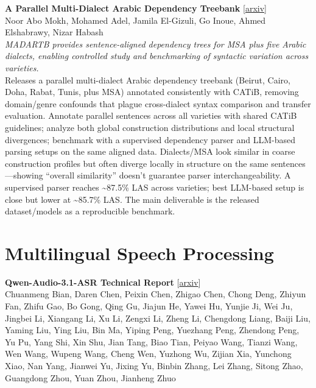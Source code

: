 \documentclass[12pt,letterpaper]{article}
\begin{document}
\medskip

{\small\textbf{A Parallel Multi-Dialect Arabic Dependency Treebank}} {\scriptsize[\href{https://arxiv.org/abs/2610.28823}{arxiv}]}\\
{\scriptsize Noor Abo Mokh, Mohamed Adel, Jamila El-Gizuli, Go Inoue, Ahmed Elshabrawy, Nizar Habash}\\

{\small\textit{MADARTB provides sentence-aligned dependency trees for MSA plus five Arabic dialects, enabling controlled study and benchmarking of syntactic variation across varieties.}}\\[1pt]
{\footnotesize Releases a parallel multi-dialect Arabic dependency treebank (Beirut, Cairo, Doha, Rabat, Tunis, plus MSA) annotated consistently with CATiB, removing domain/genre confounds that plague cross-dialect syntax comparison and transfer evaluation. Annotate parallel sentences across all varieties with shared CATiB guidelines; analyze both global construction distributions and local structural divergences; benchmark with a supervised dependency parser and LLM-based parsing setups on the same aligned data. Dialects/MSA look similar in coarse construction profiles but often diverge locally in structure on the same sentences---showing ``overall similarity'' doesn't guarantee parser interchangeability. A supervised parser reaches \textasciitilde{}87.5\% LAS across varieties; best LLM-based setup is close but lower at \textasciitilde{}85.7\% LAS. The main deliverable is the released dataset/models as a reproducible benchmark.}

\medskip


\section*{Multilingual Speech Processing}

{\small\textbf{Qwen-Audio-3.1-ASR Technical Report}} {\scriptsize[\href{https://arxiv.org/abs/2610.28711}{arxiv}]}\\
{\scriptsize Chuanmeng Bian, Daren Chen, Peixin Chen, Zhigao Chen, Chong Deng, Zhiyun Fan, Zhifu Gao, Bo Gong, Qing Gu, Jiajun He, Yawei Hu, Yunjie Ji, Wei Ju, Jingbei Li, Xiangang Li, Xu Li, Zengxi Li, Zheng Li, Chengdong Liang, Baiji Liu, Yaming Liu, Ying Liu, Bin Ma, Yiping Peng, Yuezhang Peng, Zhendong Peng, Yu Pu, Yang Shi, Xin Shu, Jian Tang, Biao Tian, Peiyao Wang, Tianzi Wang, Wen Wang, Wupeng Wang, Cheng Wen, Yuzhong Wu, Zijian Xia, Yunchong Xiao, Nan Yang, Jianwei Yu, Jixing Yu, Binbin Zhang, Lei Zhang, Sitong Zhao, Guangdong Zhou, Yuan Zhou, Jianheng Zhuo}\\
\end{document}
